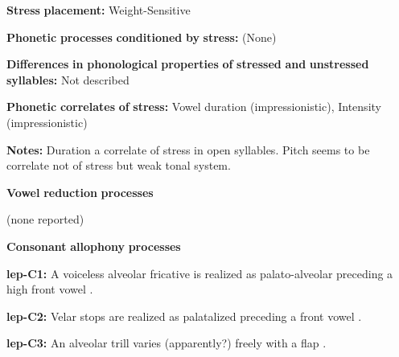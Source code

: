 \begin{styleBody}
\textbf{Stress} \textbf{placement:} Weight-Sensitive
\end{styleBody}

\begin{styleBody}
\textbf{Phonetic} \textbf{processes} \textbf{conditioned} \textbf{by} \textbf{stress:} (None)
\end{styleBody}

\begin{styleBody}
\textbf{Differences} \textbf{in} \textbf{phonological} \textbf{properties} \textbf{of} \textbf{stressed} \textbf{and} \textbf{unstressed} \textbf{syllables:} Not described
\end{styleBody}

\begin{styleBody}
\textbf{Phonetic} \textbf{correlates} \textbf{of} \textbf{stress:} Vowel duration (impressionistic), Intensity (impressionistic)
\end{styleBody}

\begin{styleBody}
\textbf{Notes:} Duration a correlate of stress in open syllables. Pitch seems to be correlate not of stress but weak tonal system.
\end{styleBody}

\begin{styleBody}
\textbf{Vowel} \textbf{reduction} \textbf{processes}
\end{styleBody}

\begin{styleBody}
(none reported)
\end{styleBody}

\begin{styleBody}
\textbf{Consonant} \textbf{allophony} \textbf{processes}
\end{styleBody}

\begin{styleBody}
\textbf{lep-C1:} A voiceless alveolar fricative is realized as palato-alveolar preceding a high front vowel \citep[27]{Plaisier2007}.
\end{styleBody}

\begin{styleBody}
\textbf{lep-C2:} Velar stops are realized as palatalized preceding a front vowel \citep[21]{Plaisier2007}.
\end{styleBody}

\begin{styleBody}
\textbf{lep-C3:} An alveolar trill varies (apparently?) freely with a flap \citep[28]{Plaisier2007}.
\end{styleBody}

